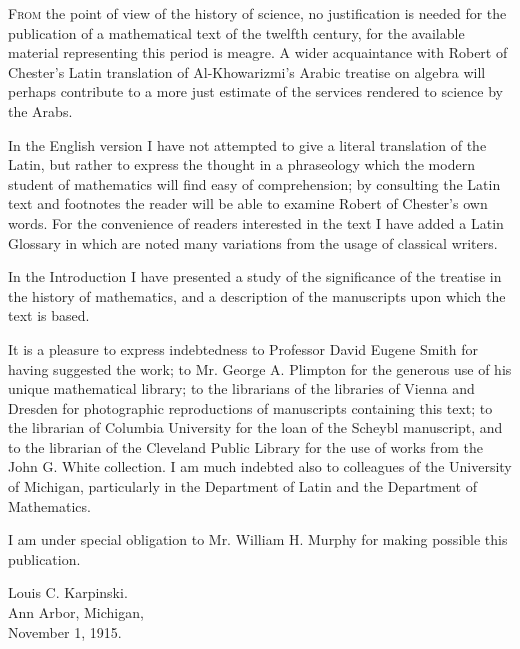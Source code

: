 \documentclass[11pt,a4paper]{book}
\begin{document}
\lettrine[lines=3]{F}{rom} the point of view of the history of science, no justification is needed for the publication of a mathematical text of the twelfth century, for the available material representing this period is meagre. A wider acquaintance with Robert of Chester's Latin translation of Al-Khowarizmi's Arabic treatise on algebra will perhaps contribute to a more just estimate of the services rendered to science by the Arabs.

In the English version I have not attempted to give a literal translation of the Latin, but rather to express the thought in a phraseology which the modern student of mathematics will find easy of comprehension; by consulting the Latin text and footnotes the reader will be able to examine Robert of Chester's own words. For the convenience of readers interested in the text I have added a Latin Glossary in which are noted many variations from the usage of classical writers.

In the Introduction I have presented a study of the significance of the treatise in the history of mathematics, and a description of the manuscripts upon which the text is based.

It is a pleasure to express indebtedness to Professor David Eugene Smith for having suggested the work; to Mr. George A. Plimpton for the generous use of his unique mathematical library; to the librarians of the libraries of Vienna and Dresden for photographic reproductions of manuscripts containing this text; to the librarian of Columbia University for the loan of the Scheybl manuscript, and to the librarian of the Cleveland Public Library for the use of works from the John G. White collection. I am much indebted also to colleagues of the University of Michigan, particularly in the Department of Latin and the Department of Mathematics.

I am under special obligation to Mr. William H. Murphy for making possible this publication.

\begin{flushright}
Louis C. Karpinski.\\
Ann Arbor, Michigan,\\
November 1, 1915.
\end{flushright}

\tableofcontents

\mainmatter
\end{document}
